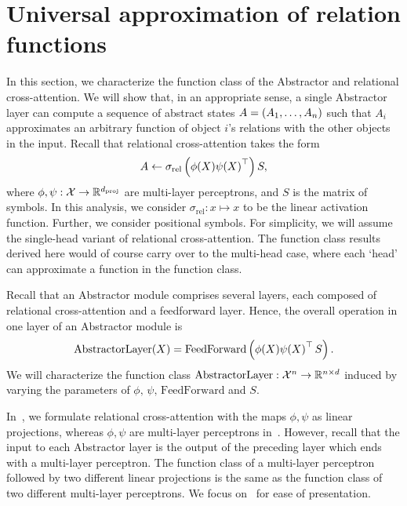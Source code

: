 \section{Universal approximation of relation functions}\label{sec:abstractor_approx_theory}

In this section, we characterize the function class of the Abstractor and relational cross-attention. We will show that, in an appropriate sense, a single Abstractor layer can compute a sequence of abstract states $A = (A_1, \ldots, A_n)$ such that $A_i$ approximates an arbitrary function of object $i$'s relations with the other objects in the input. Recall that relational cross-attention takes the form
\begin{equation*}
    A \gets \sigma_{\mathrm{rel}}\left(\phi(X) {\psi(X)}^\top\right) S,
\end{equation*}
where $\phi, \psi: {\mathcal{X}} \to \mathbb{R}^{d_{\mathrm{proj}}}$ are multi-layer perceptrons, and $S$ is the matrix of symbols. In this analysis, we consider $\sigma_{\mathrm{rel}}: x \mapsto x$ to be the linear activation function. Further, we consider positional symbols. For simplicity, we will assume the single-head variant of relational cross-attention. The function class results derived here would of course carry over to the multi-head case, where each `head' can approximate a function in the function class.

Recall that an Abstractor module comprises several layers, each composed of relational cross-attention and a feedforward layer. Hence, the overall operation in one layer of an Abstractor module is
\begin{equation}\label{eq:abstractor_layer}
    \mathrm{AbstractorLayer}(X) = \mathrm{FeedForward}\left(\phi(X) {\psi(X)}^\top \, S\right).
\end{equation}
We will characterize the function class $\mathrm{AbstractorLayer}: {\mathcal{X}}^n \to \mathbb{R}^{n \times d}$ induced by varying the parameters of $\phi,\, \psi,\, \mathrm{FeedForward}$ and $S$.

\begin{remark}
    In~, we formulate relational cross-attention with the maps $\phi, \psi$ as linear projections, whereas $\phi, \psi$ are multi-layer perceptrons in~. However, recall that the input to each Abstractor layer is the output of the preceding layer which ends with a multi-layer perceptron. The function class of a multi-layer perceptron followed by two different linear projections is the same as the function class of two different multi-layer perceptrons. We focus on~ for ease of presentation.
\end{remark}

